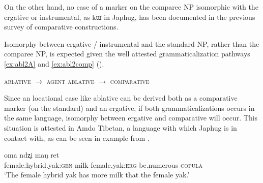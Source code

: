 \documentclass[oldfontcommands,oneside,a4paper,11pt]{article}
\newcommand{\ipa}[1]{{\phon #1}} %
\begin{document}
On the other hand, no case of a marker   on the comparee NP isomorphic with the ergative or instrumental, as \ipa{kɯ} in Japhug, has been documented in the previous survey of comparative constructions.

\begin{table}[h]
\caption{Combination of chapters 98 (Alignment of Case Marking of Full Nouns) and 121 (Comparative constructions) of the WALS} \label{tab:stassen}
\end{table}
 
Isomorphy between ergative / instrumental and the standard NP, rather than the comparee NP, is expected given the well attested grammaticalization pathways \ref{ex:abl2A} and \ref{ex:abl2comp} (\citealt[29]{heine-kuteva02}).
 


\begin{exe}
\ex \label{ex:abl2A}
\glt \textsc{ablative} $\rightarrow$ \textsc{agent} 
\ex \label{ex:abl2comp}
\glt \textsc{ablative} $\rightarrow$ \textsc{comparative}
\end{exe}

Since an locational case like ablative can be derived both as a comparative marker (on the standard) and  an ergative, if both grammaticalizations occurs in the same language, isomorphy between ergative and comparative will occur. This situation is attested in Amdo Tibetan, a language with which Japhug is in contact with, as can be seen in example from \citet[255]{skalbzang02dialectes}.

\begin{exe}
\ex \label{ex:vbris}
\gll \ipa{ndzomi}  	\ipa{oma}  	\ipa{ndʐi}  	\ipa{maŋ}  	\ipa{ret}  \\
female.hybrid.yak:\textsc{gen} milk female.yak:\textsc{erg} be.numerous \textsc{copula} \\
\glt `The female hybrid yak has more milk that the female yak.'
\end{exe}
\end{document}
